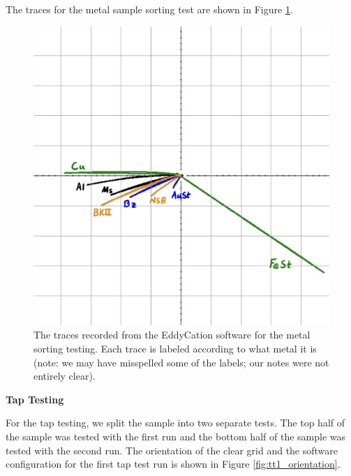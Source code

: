 \documentclass[12 pt]{report}
\begin{document}
The traces for the metal sample sorting test are shown in Figure \ref{fig:ec_metal_sorting}.

\begin{figure}[htbp]
	\centering
	\includegraphics[width=6in]{images/graphs/eddy current testing/S4G2Metal2-labeled}
	\caption{The traces recorded from the EddyCation software for the metal sorting testing. Each trace is labeled according to what metal it is (note: we may have misspelled some of the labels; our notes were not entirely clear).}
	\label{fig:ec_metal_sorting}
\end{figure}

\newpage

\textbf{Tap Testing}

For the tap testing, we split the sample into two separate tests. The top half of the sample was tested with the first run and the bottom half of the sample was tested with the second run. The orientation of the clear grid and the software configuration for the first tap test run is shown in Figure \ref{fig:tt1_orientation}.
\end{document}

